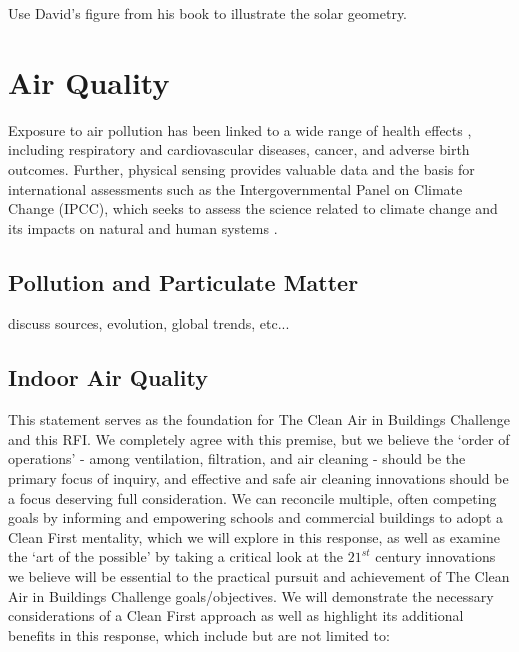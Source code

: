 Use David's figure from his book to illustrate the solar geometry.



\section{Air Quality}

Exposure to air pollution has been linked to a wide range of health effects \cite{Brook2008, Kelly2011, Xu2017}, including respiratory and cardiovascular diseases, cancer, and adverse birth outcomes. Further, physical sensing provides valuable data and the basis for international assessments such as the Intergovernmental Panel on Climate Change (IPCC), which seeks to assess the science related to climate change and its impacts on natural and human systems \cite{IPCC1990, IPCC1995, IPCC2001, IPCC2007a, IPCC2007b, IPCC2007c, IPCC2013a, IPCC2013b, IPCC2014, IPCC2018, Friedlingstein2020, Huang2017}.

\subsection{Pollution and Particulate Matter}
discuss sources, evolution, global trends, etc...

\subsection{Indoor Air Quality}

This statement serves as the foundation for The Clean Air in Buildings Challenge and this RFI. We completely agree with this premise, but we believe the ‘order of operations’ - among ventilation, filtration, and air cleaning - should be the primary focus of inquiry, and effective and safe air cleaning innovations should be a focus deserving full consideration. We can reconcile multiple, often competing goals by informing and empowering schools and commercial buildings to adopt a  Clean First mentality, which we will explore in this response, as well as examine the ‘art of the possible’ by taking a critical look at the $21^{st}$ century innovations we believe will be essential to the practical pursuit and achievement of The Clean Air in Buildings Challenge goals/objectives. We will demonstrate the necessary considerations of a Clean First approach as well as highlight its additional benefits in this response, which include but are not limited to:


